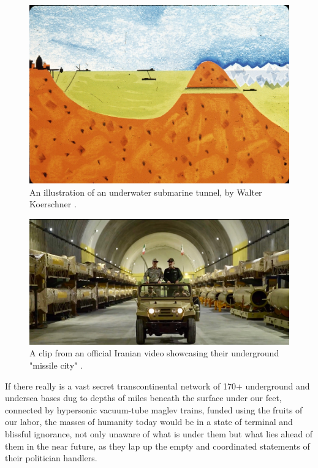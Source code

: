 \documentclass[10pt,twocolumn,letterpaper]{article}
\begin{document}
\begin{figure}[t]
\begin{center}
   \includegraphics[width=1\linewidth]{sub.jpg}
\end{center}
   \caption{An illustration of an underwater submarine tunnel, by Walter Koerschner \cite{22,23}.}
\label{fig:6}
\label{fig:onecol}
\end{figure}

\begin{figure}[t]
\begin{center}
   \includegraphics[width=1\linewidth]{iran.jpeg}
\end{center}
   \caption{A clip from an official Iranian video showcasing their underground "missile city" \cite{39,40}.}
\label{fig:12}
\label{fig:onecol}
\end{figure}

If there really is a vast secret transcontinental network of 170+ underground and undersea bases dug to depths of miles beneath the surface under our feet, connected by hypersonic vacuum-tube maglev trains, funded using the fruits of our labor, the masses of humanity today would be in a state of terminal and blissful ignorance, not only unaware of what is under them but what lies ahead of them in the near future, as they lap up the empty and coordinated statements of their politician handlers.
\end{document}
